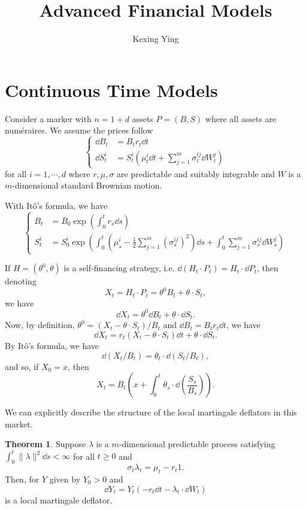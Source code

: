 \documentclass[]{article}
\title{Advanced Financial Models}
\author{Kexing Ying}
\theoremstyle{definition}
\newtheorem{theorem}{Theorem}
\begin{document}
\maketitle

\section*{Continuous Time Models}

Consider a marker with \(n = 1 + d\) assets \(P = (B, S)\) where all assets are numéraires. We assume 
the prices follow
\[\begin{cases}
  \dd B_t & = B_t r_t \dd t\\
  \dd S_t^i & = S_t^i \left(\mu_t^i \dd t + \sum_{j = 1}^m \sigma_t^{ij} \dd W_t^j\right)
\end{cases}\]
for all \(i = 1, \cdots, d\) where \(r, \mu, \sigma\) are predictable and suitably integrable and \(W\) 
is a \(m\)-dimensional standard Brownian motion.

With Itô's formula, we have 
\[\begin{cases}
  B_t & = B_0 \exp\left(\int_0^t r_s \dd s\right)\\
  S_t^i & = S_0^i \exp\left(\int_0^t \left(\mu_s^i - \frac{1}{2} \sum_{j = 1}^m (\sigma_s^{ij})^2\right) \dd s 
      + \int_0^t \sum_{j = 1}^m \sigma_s^{ij} \dd W_s^j\right)
\end{cases}\]

If \(H = (\theta^0, \theta)\) is a self-financing strategy, i.e. \(\dd(H_t \cdot P_t) = H_t \cdot \dd P_t\), then denoting 
\[X_t = H_t \cdot P_t = \theta^0 B_t + \theta \cdot S_t,\]
we have 
\[\dd X_t = \theta^0 \dd B_t + \theta \cdot \dd S_t.\]
Now, by definition, \(\theta^0 = (X_t - \theta \cdot S_t) / B_t\) and \(\dd B_t = B_t r_t \dd t\), we have 
\[\dd X_t = r_t(X_t - \theta \cdot S_t) \dd t + \theta \cdot \dd S_t.\]
By Itô's formula, we have
\[\dd (X_t / B_t) = \theta_t \cdot \dd (S_t / B_t),\]
and so, if \(X_0 = x\), then
\[X_t = B_t \left(x + \int_0^t \theta_s \cdot \dd\left(\frac{S_s}{B_s}\right)\right).\]

We can explicitly describe the structure of the local martingale deflators in this market.

\begin{theorem}
  Suppose \(\lambda\) is a \(m\)-dimensional predictable process satisfying 
  \(\int_0^t \|\lambda\|^2 \dd s < \infty\) for all \(t \ge 0\) and 
  \[\sigma_t \lambda_t = \mu_t - r_t 1.\]
  Then, for \(Y\) given by \(Y_0 > 0\) and
  \[\dd Y_t = Y_t(-r_t \dd t - \lambda_t \cdot \dd W_t)\]
  is a local martingale deflator.
\end{theorem}
\end{document}
